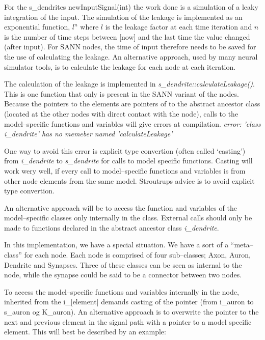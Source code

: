 
	For the s\_dendrites newInputSignal(int) the work done is a simulation of a leaky integration of the input. 
	The simulation of the leakage is implemented as an exponential function, $l^n$ where $l$ is the leakage factor at each time iteration and $n$ is the number of time steps between [now] and the last time the value changed (after input).
	For SANN nodes, the time of input therefore needs to be saved for the use of calculating the leakage. An alternative approach, used by many neural simulator tools, is to calculate the leakage for each node at each iteration.
	
	The calculation of the leakage is implemented in \emph{s\_dendrite::calculateLeakage()}. This is one function that only is present in the SANN variant of the nodes. 
	Because the pointers to the elements are pointers of to the abstract ancestor class (located at the other nodes with direct contact with the node), calls to the model--specific functions and variables will give errors at compilation.
	\newline \emph{error: 'class i\_dendrite' has no memeber named 'calculateLeakage'}

	One way to avoid this error is explicit type convertion (often called `casting') from \emph{i\_dendrite} to \emph{s\_dendrite} for calls to model specific functions.
	Casting will work wery well, if every call to model--specific functions and variables is from other node elements from the same model.
	Stroutrups advice is to avoid explicit type convertion\cite{Stroustrup2000KAP6}. 
	
	An alternative approach will be to access the function and variables of the model--specific classes only internally in the class. 
	External calls should only be made to functions declared in the abstract ancestor class \emph{i\_dendrite}.

	In this implementation, we have a special situation. We have a sort of a ``meta--class'' for each node. Each node is comprised of four sub--classes; Axon, Auron, Dendrite and Synapses. 
	Three of these classes can be seen as internal to the node, while the synapse could be said to be a connector between two nodes.

	To access the model--specific functions and variables internally in the node, inherited from the i\_[element] demands casting of the pointer (from i\_auron to s\_auron og K\_auron). 
	An alternative approach is to overwrite the pointer to the next and previous element in the signal path with a pointer to a model specific element.
	This will best be described by an example:

